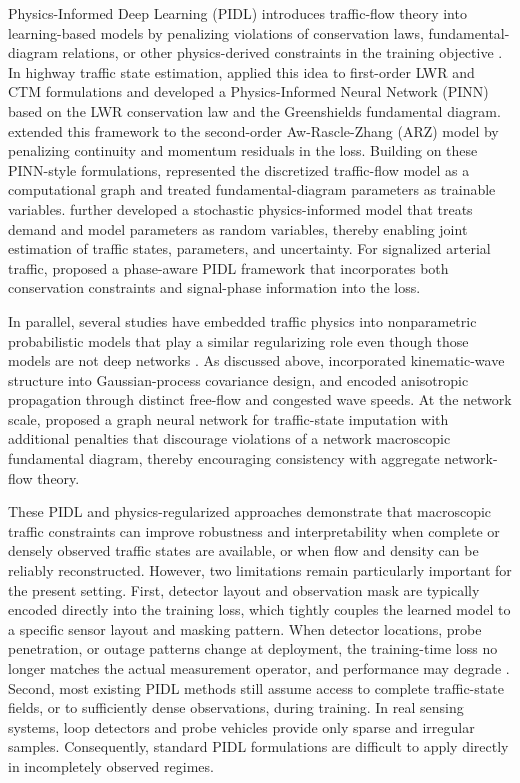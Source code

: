 \documentclass[a4paper,fleqn]{cas-sc}
\numberwithin{equation}{section}
\begin{document}
Physics-Informed Deep Learning (PIDL) introduces traffic-flow theory into learning-based models by penalizing violations of conservation laws, fundamental-diagram relations, or other physics-derived constraints in the training objective \citep{raissi2019physics, di2023physics}. In highway traffic state estimation, \citet{huang2020physics} applied this idea to first-order LWR and CTM formulations and developed a Physics-Informed Neural Network (PINN) based on the LWR conservation law and the Greenshields fundamental diagram. \citet{shi2021physics} extended this framework to the second-order Aw-Rascle-Zhang (ARZ) model by penalizing continuity and momentum residuals in the loss. Building on these PINN-style formulations, \citet{zhang2024physics} represented the discretized traffic-flow model as a computational graph and treated fundamental-diagram parameters as trainable variables. \citet{wang2024knowledge} further developed a stochastic physics-informed model that treats demand and model parameters as random variables, thereby enabling joint estimation of traffic states, parameters, and uncertainty. For signalized arterial traffic, \citet{abewickrema2026physics} proposed a phase-aware PIDL framework that incorporates both conservation constraints and signal-phase information into the loss.

In parallel, several studies have embedded traffic physics into nonparametric probabilistic models that play a similar regularizing role even though those models are not deep networks \citep{di2023physics}. As discussed above, \citet{yuan2021macroscopic} incorporated kinematic-wave structure into Gaussian-process covariance design, and \citet{wu2024traffic} encoded anisotropic propagation through distinct free-flow and congested wave speeds. At the network scale, \citet{xue2024network} proposed a graph neural network for traffic-state imputation with additional penalties that discourage violations of a network macroscopic fundamental diagram, thereby encouraging consistency with aggregate network-flow theory.

These PIDL and physics-regularized approaches demonstrate that macroscopic traffic constraints can improve robustness and interpretability when complete or densely observed traffic states are available, or when flow and density can be reliably reconstructed. However, two limitations remain particularly important for the present setting. First, detector layout and observation mask are typically encoded directly into the training loss, which tightly couples the learned model to a specific sensor layout and masking pattern. When detector locations, probe penetration, or outage patterns change at deployment, the training-time loss no longer matches the actual measurement operator, and performance may degrade \citep{di2023physics, thodi2022incorporating, xue2024network}. Second, most existing PIDL methods still assume access to complete traffic-state fields, or to sufficiently dense observations, during training. In real sensing systems, loop detectors and probe vehicles provide only sparse and irregular samples. Consequently, standard PIDL formulations are difficult to apply directly in incompletely observed regimes.
\end{document}
